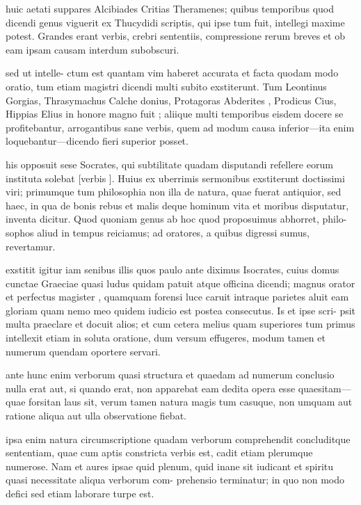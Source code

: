  huic aetati suppares Alcibiades Critias Theramenes; quibus temporibus quod dicendi genus viguerit ex Thucydidi scriptis, qui ipse tum fuit, intellegi maxime potest. Grandes erant verbis, crebri sententiis, compressione rerum breves et ob eam ipsam causam interdum subobscuri.

 sed ut intelle- ctum est quantam vim haberet accurata et facta quodam modo oratio, tum etiam magistri dicendi multi subito exstiterunt. Tum Leontinus Gorgias, Thrasymachus Calche donius, Protagoras Abderites , Prodicus Cius, Hippias Elius in honore magno fuit ; aliique multi temporibus eisdem docere se profitebantur, arrogantibus sane verbis, quem ad modum causa inferior—ita enim loquebantur—dicendo fieri superior posset.

 his opposuit sese Socrates, qui subtilitate quadam disputandi refellere eorum instituta solebat [verbis ]. Huius ex uberrimis sermonibus exstiterunt doctissimi viri; primumque tum philosophia non illa de natura, quae fuerat antiquior, sed haec, in qua de bonis rebus et malis deque hominum vita et moribus disputatur, inventa dicitur. Quod quoniam genus ab hoc quod proposuimus abhorret, philo- sophos aliud in tempus reiciamus; ad oratores, a quibus digressi sumus, revertamur.

 exstitit igitur iam senibus illis quos paulo ante diximus Isocrates, cuius domus cunctae Graeciae quasi ludus quidam patuit atque officina dicendi; magnus orator et perfectus magister , quamquam forensi luce caruit intraque parietes aluit eam gloriam quam nemo meo quidem iudicio est postea consecutus. Is et ipse scri- psit multa praeclare et docuit alios; et cum cetera melius quam superiores tum primus intellexit etiam in soluta oratione, dum versum effugeres, modum tamen et numerum quendam oportere servari.

 ante hunc enim verborum quasi structura et quaedam ad numerum conclusio nulla erat aut, si quando erat, non apparebat eam dedita opera esse quaesitam—quae forsitan laus sit, verum tamen natura magis tum casuque, non umquam aut ratione aliqua aut ulla observatione fiebat.

 ipsa enim natura circumscriptione quadam verborum comprehendit concluditque sententiam, quae cum aptis constricta verbis est, cadit etiam plerumque numerose. Nam et aures ipsae quid plenum, quid inane sit iudicant et spiritu quasi necessitate aliqua verborum com- prehensio terminatur; in quo non modo defici sed etiam laborare turpe est.


